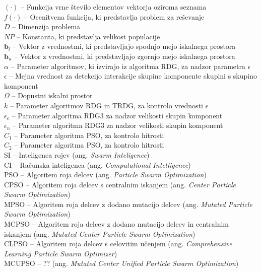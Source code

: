 \ell$(\cdot)$ -- Funkcija vrne število elementov vektorja oziroma seznama \\
$f(\cdot)$ -- Ocenitvena funkcija, ki predstavlja problem za reševanje \\
$\mathit{D}$ -- Dimenzija problema \\
$\mathit{NP}$ -- Konstanta, ki predstavlja velikost populacije \\
$\mathbf{b}_{l}$ -- Vektor z vrednostmi, ki predstavljajo spodnjo mejo iskalnega prostora \\
$\mathbf{b}_{u}$ -- Vektor z vrednostmi, ki predstavljajo zgornjo mejo iskalnega prostora \\
$\alpha$ -- Parameter algoritmov, ki izvirajo iz algoritma RDG, za nadzor parametra $\epsilon$  \\
$\epsilon$ -- Mejna vrednost za detekcijo interakcije skupine komponente skupini s skupino komponent \\
$\Omega$ -- Dopustni iskalni prostor \\
$k$ -- Parameter algoritmov RDG in TRDG, za kontrolo vrednosti $\epsilon$ \\
$\epsilon_e$ -- Parameter algoritma RDG3 za nadzor velikosti skupin komponent \\
$\epsilon_n$ -- Parameter algoritma RDG3 za nadzor velikosti skupin komponent \\
$C_1$ -- Parameter algoritma PSO, za kontrolo hitrosti \\
$C_2$ -- Parameter algoritma PSO, za kontrolo hitrosti \\
SI -- Inteligenca rojev (ang. \textit{Swarm Inteligence}) \\
CI -- Računska inteligenca (ang. \textit{Computational Intelligence}) \\
PSO -- Algoritem roja delcev (ang. \textit{Particle Swarm Optimization}) \\
CPSO -- Algoritem roja delcev s centralnim iskanjem (ang. \textit{Center Particle Swarm Optimization}) \\
MPSO -- Algoritem roja delcev z dodano mutacijo delcev (ang. \textit{Mutated Particle Swarm Optimization}) \\
MCPSO -- Algoritem roja delcev z dodano mutacijo delcev in centralnim iskanjem (ang. \textit{Mutated Center Particle Swarm Optimization}) \\
CLPSO -- Algoritem roja delcev s celovitim učenjem (ang. \textit{Comprehensive Learning Particle Swarm Optimizer}) \\
MCUPSO -- ?? (ang. \textit{Mutated Center Unified Particle Swarm Optimization}) \\

